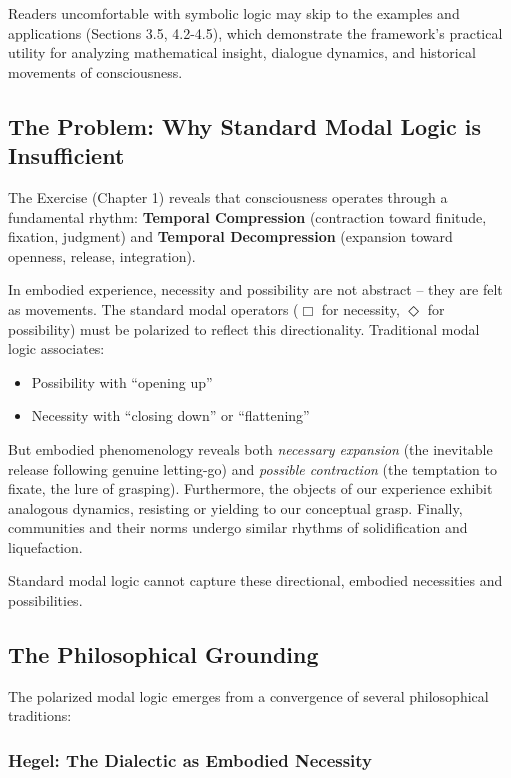 \documentclass[12pt]{book}
\begin{document}
Readers uncomfortable with symbolic logic may skip to the examples and applications (Sections 3.5, 4.2-4.5), which demonstrate the framework's practical utility for analyzing mathematical insight, dialogue dynamics, and historical movements of consciousness.

\subsection{The Problem: Why Standard Modal Logic is Insufficient}

The Exercise (Chapter 1) reveals that consciousness operates through a fundamental rhythm: \textbf{Temporal Compression} (contraction toward finitude, fixation, judgment) and \textbf{Temporal Decompression} (expansion toward openness, release, integration).

In embodied experience, necessity and possibility are not abstract -- they are felt as movements. The standard modal operators ($\Box$ for necessity, $\Diamond$ for possibility) must be polarized to reflect this directionality. Traditional modal logic associates:

\begin{itemize}
\item Possibility with ``opening up''
\item Necessity with ``closing down'' or ``flattening''
\end{itemize}

But embodied phenomenology reveals both \textit{necessary expansion} (the inevitable release following genuine letting-go) and \textit{possible contraction} (the temptation to fixate, the lure of grasping). Furthermore, the objects of our experience exhibit analogous dynamics, resisting or yielding to our conceptual grasp. Finally, communities and their norms undergo similar rhythms of solidification and liquefaction.

Standard modal logic cannot capture these directional, embodied necessities and possibilities.

\subsection{The Philosophical Grounding}

The polarized modal logic emerges from a convergence of several philosophical traditions:

\subsubsection{Hegel: The Dialectic as Embodied Necessity}
\end{document}
